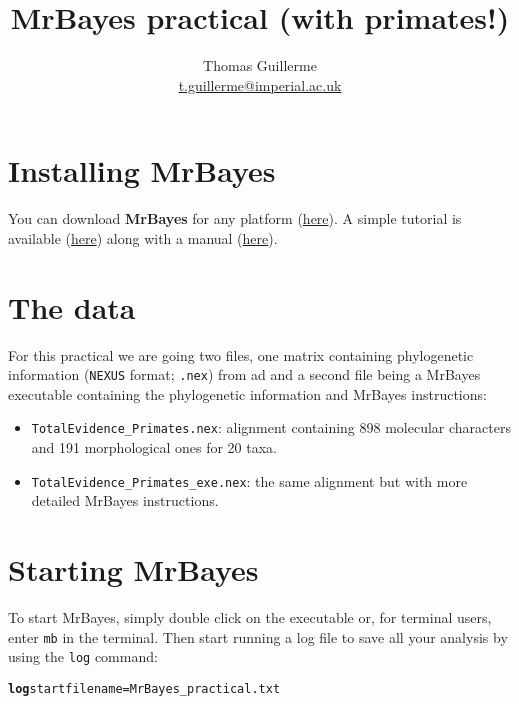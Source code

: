 \documentclass{article}\usepackage[]{graphicx}\usepackage[]{color}
\makeatletter
\newcommand{\hlstr}[1]{\textcolor[rgb]{0.192,0.494,0.8}{#1}}%
\newcommand{\hlkwd}[1]{\textcolor[rgb]{0.737,0.353,0.396}{\textbf{#1}}}%
\newenvironment{kframe}{%
 \def\at@end@of@kframe{}%
 \ifinner\ifhmode%
  \def\at@end@of@kframe{\end{minipage}}%
  \begin{minipage}{\columnwidth}%
 \fi\fi%
 \def\FrameCommand##1{\hskip\@totalleftmargin \hskip-\fboxsep
 \colorbox{shadecolor}{##1}\hskip-\fboxsep
     \hskip-\linewidth \hskip-\@totalleftmargin \hskip\columnwidth}%
 \MakeFramed {\advance\hsize-\width
   \@totalleftmargin\z@ \linewidth\hsize
   \@setminipage}}%
 {\par\unskip\endMakeFramed%
 \at@end@of@kframe}
\newenvironment{knitrout}{}{} %
\makeatother
\begin{document}
\title{MrBayes practical (with primates!)}

\author{Thomas Guillerme\\\href{mailto:t.guillerme@imperial.ac.uk}{t.guillerme@imperial.ac.uk}}

\maketitle

\tableofcontents

\section{Installing MrBayes}
You can download \textbf{MrBayes} \citep{Ronquist2012mrbayes} for any platform (\href{http://mrbayes.sourceforge.net/}{here}).
A simple tutorial is available (\href{http://mrbayes.sourceforge.net/wiki/index.php/Tutorial_3.2}{here}) along with a manual (\href{http://mrbayes.sourceforge.net/wiki/index.php/Manual_3.2}{here}).

\section{The data}
For this practical we are going two files, one matrix containing phylogenetic information (\texttt{NEXUS} format; \texttt{.nex}) from \cite{hayasaka1988molecular} ad \cite{stevens2013palaeontological} and a second file being a MrBayes executable containing the phylogenetic information and MrBayes instructions:
\begin{itemize}
\item{\texttt{TotalEvidence\_Primates.nex}}: alignment containing 898 molecular characters and 191 morphological ones for 20 taxa.
\item{\texttt{TotalEvidence\_Primates\_exe.nex}}: the same alignment but with more detailed MrBayes instructions.
\end{itemize}

\section{Starting MrBayes}
To start MrBayes, simply double click on the executable or, for terminal users, enter \texttt{mb} in the terminal.
Then start running a log file to save all your analysis by using the \texttt{log} command:

\begin{knitrout}
\color{fgcolor}\begin{kframe}
\begin{alltt}
\hlkwd{log} start filename=\hlstr{MrBayes_practical.txt}
\end{alltt}
\end{kframe}
\end{knitrout}
\end{document}
